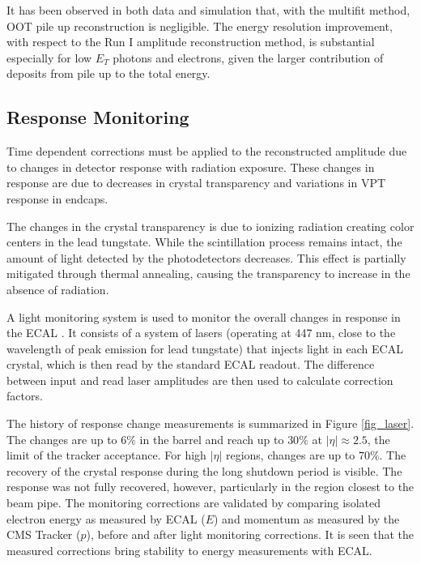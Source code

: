 It has been observed in both data and simulation that, with the multifit method, OOT pile up reconstruction is negligible. The energy resolution improvement, with respect to the Run I amplitude reconstruction method, is substantial especially for low $E_{T}$ photons and electrons, given the larger contribution of deposits from pile up to the total energy.


\subsection{Response Monitoring}

Time dependent corrections must be applied to the reconstructed amplitude due to changes in detector response with radiation exposure. These changes in response are due to decreases in crystal transparency and variations in VPT response in endcaps.

The changes in the crystal transparency is due to ionizing radiation creating color centers in the lead tungstate. While the scintillation process remains intact, the amount of light detected by the photodetectors decreases. This effect is partially mitigated through thermal annealing, causing the transparency to increase in the absence of radiation.

A light monitoring system is used to monitor the overall changes in response in the ECAL \cite{laser}. It consists of a system of lasers (operating at 447 nm, close to the wavelength of peak emission for lead tungstate) that injects light in each ECAL crystal, which is then read by the standard ECAL readout. The difference between input and read laser amplitudes are then used to calculate correction factors. %


The history of response change measurements is summarized in Figure \ref{fig_laser}. The changes are up to $6\%$ in the barrel and  reach up to $30\%$ at $|\eta| \approx 2.5$, the limit of the tracker acceptance. For high $|\eta|$ regions, changes are up to $70\%$. The recovery of the crystal response during the long shutdown period is visible. The response was not fully recovered, however, particularly in the region closest to the beam pipe. The monitoring corrections are validated by comparing isolated electron energy as measured by ECAL ($E$) and momentum as measured by the CMS Tracker ($p$), before and after light monitoring corrections. It is seen that the measured corrections bring stability to energy measurements with ECAL.


